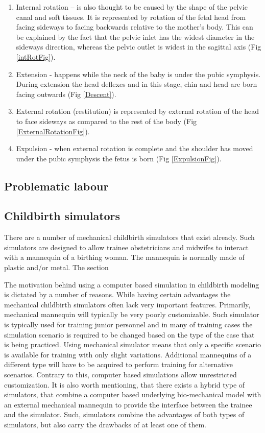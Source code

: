 \begin{enumerate}
\item Internal rotation --  is also thought to be caused by the shape of the pelvic canal and soft tissues. It is represented by rotation of the fetal head from facing sideways to facing backwards relative to the mother's body. This can be explained by the fact that the pelvic inlet has the widest diameter in the sideways direction, whereas the pelvic outlet is widest in the sagittal axis (Fig \ref{intRotFig}).

\item Extension - happens while the neck of the baby is under the pubic symphysis. During extension the head deflexes and in this stage, chin and head are born facing outwards (Fig \ref{Descent}).
\item External rotation (restitution) is represented by external rotation of the head to face sideways as compared to the rest of the body (Fig \ref{ExternalRotationFig}).

\item Expulsion -  when external rotation is complete and the shoulder has moved under the pubic symphysis the fetus is born (Fig \ref{ExpulsionFig}).

\end{enumerate}



\subsection{Problematic labour}

\subsection{Childbirth simulators}
There are a number of mechanical childbirth simulators that exist already. Such simulators are designed to allow trainee obstetricians and midwifes to interact with a mannequin of a birthing woman. The mannequin is normally made of plastic and/or metal. The section

The motivation behind using a computer based simulation in childbirth modeling is dictated by a number of reasons. While having certain advantages the mechanical childbirth simulators often lack very important features. Primarily, mechanical mannequin will typically be very poorly customizable. Such simulator is typically used for training junior personnel and in many of training cases the simulation scenario is required to be changed based on the type of the case that is being practiced. Using mechanical simulator means that only a specific scenario is available for training with only slight variations. Additional mannequins of a different type will have to be acquired to perform training for alternative scenarios. Contrary to this, computer based simulations allow unrestricted customization. It is also worth mentioning, that there exists a hybrid type of simulators, that combine a computer based underlying bio-mechanical model with an external mechanical mannequin to provide the interface between the trainee and the simulator. Such, simulators combine the advantages of both types of simulators, but also carry the drawbacks of at least one of them.

